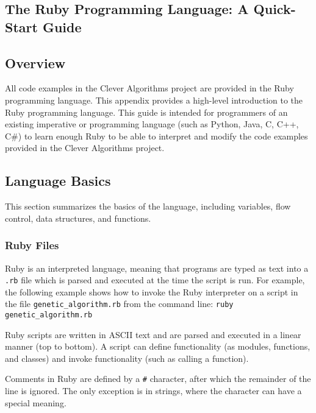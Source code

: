 

\begin{bibunit}
\chapter{The Ruby Programming Language: A Quick-Start Guide}
\label{ch:appendix1}

\section{Overview}
All code examples in the Clever Algorithms project are provided in the Ruby programming language.
This appendix provides a high-level introduction to the Ruby programming language. This guide is intended for programmers of an existing imperative or programming language (such as Python, Java, C, C++, C\#) to learn enough Ruby to be able to interpret and modify the code examples provided in the Clever Algorithms project.

\section{Language Basics}
This section summarizes the basics of the language, including variables, flow control, data structures, and functions.

\subsection{Ruby Files}
Ruby is an interpreted language, meaning that programs are typed as text into a \texttt{.rb} file which is parsed and executed at the time the script is run. For example, the following example shows how to invoke the Ruby interpreter on a script in the file \texttt{genetic\_algorithm.rb} from the command line: \texttt{ruby genetic\_algorithm.rb}

Ruby scripts are written in ASCII text and are parsed and executed in a linear manner (top to bottom). A script can define functionality (as modules, functions, and classes) and invoke functionality (such as calling a function). 

Comments in Ruby are defined by a \texttt{\#} character, after which the remainder of the line is ignored. The only exception is in strings, where the character can have a special meaning.


\end{bibunit}
